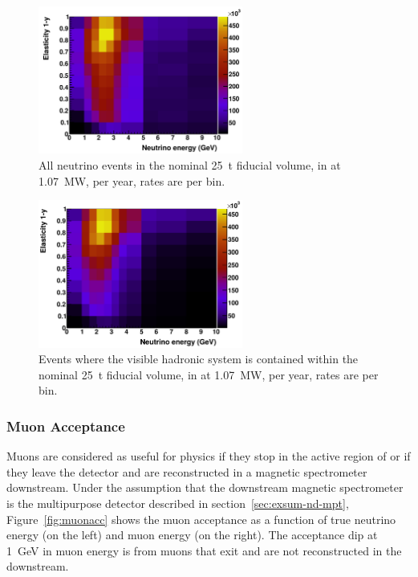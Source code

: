\begin{figure}[tbp]
	\centering
	\includegraphics[width=0.6\textwidth]{graphics/all_ey.png}
	\caption{All neutrino events in the nominal \SI{25}{\tonne} fiducial volume, in  at \SI{1.07}{\mega\watt}, per year, rates are per bin.}
	\label{fig:all_ey}
\end{figure}

\begin{figure}[tbp]
	\centering
	\includegraphics[width=0.6\textwidth]{graphics/hadContNorm_ey.png}
	\caption{Events where the visible hadronic system is contained within the nominal \SI{25}{\tonne} fiducial volume, in  at \SI{1.07}{\mega\watt}, per year, rates are per bin.}
	\label{fig:hadContNorm_ey}
\end{figure}

\subsubsection{Muon Acceptance}\label{sec:muacc}

Muons are considered as useful for physics if they stop in the active region of  or if they leave the  detector and are reconstructed in a magnetic spectrometer downstream.  Under the assumption that the downstream magnetic spectrometer is the multipurpose detector described in section~\ref{sec:exsum-nd-mpt}, Figure~\ref{fig:muonacc}  shows the muon acceptance as a function of true neutrino energy (on the left) and muon energy (on the right). The acceptance dip at \SI{1}{GeV} in muon energy is from muons that exit  and are not reconstructed in the  downstream.

